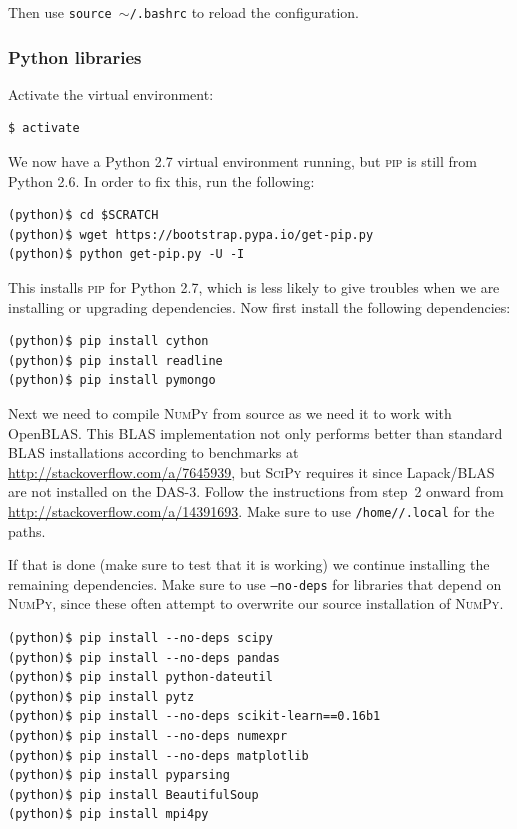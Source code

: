 \documentclass{article}
\begin{document}
Then use \texttt{source $\sim$/.bashrc} to reload the configuration.

\subsubsection{Python libraries}\label{app:python-libraries}
Activate the virtual environment:

\begin{verbatim}
$ activate
\end{verbatim}

We now have a Python 2.7 virtual environment running, but \textsc{pip} is still 
from Python 2.6. In order to fix this, run the following:

\begin{verbatim}
(python)$ cd $SCRATCH
(python)$ wget https://bootstrap.pypa.io/get-pip.py
(python)$ python get-pip.py -U -I
\end{verbatim}

This installs \textsc{pip} for Python 2.7, which is less likely to give 
troubles when we are installing or upgrading dependencies. Now first install the following dependencies:

\begin{verbatim}
(python)$ pip install cython
(python)$ pip install readline
(python)$ pip install pymongo
\end{verbatim}

Next we need to compile \textsc{NumPy} from source as we need it to work with 
OpenBLAS\@. This BLAS implementation not only performs better than standard
BLAS installations according to benchmarks at 
\url{http://stackoverflow.com/a/7645939}, but \textsc{SciPy} requires it 
since Lapack/BLAS are not installed on the DAS-3. Follow the instructions 
from step~2 onward from \url{http://stackoverflow.com/a/14391693}. Make sure to 
use \texttt{/home//.local} for the paths.

If that is done (make sure to test that it is working) we continue installing 
the remaining dependencies. Make sure to use \texttt{--no-deps} for libraries 
that depend on \textsc{NumPy}, since these often attempt to overwrite our 
source installation of \textsc{NumPy}.

\begin{verbatim}
(python)$ pip install --no-deps scipy
(python)$ pip install --no-deps pandas
(python)$ pip install python-dateutil
(python)$ pip install pytz
(python)$ pip install --no-deps scikit-learn==0.16b1
(python)$ pip install --no-deps numexpr
(python)$ pip install --no-deps matplotlib
(python)$ pip install pyparsing
(python)$ pip install BeautifulSoup
(python)$ pip install mpi4py
\end{verbatim}
\end{document}
